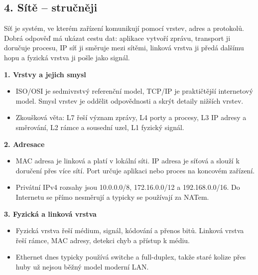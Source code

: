 
\subsection*{4. Sítě -- stručněji}
Síť je systém, ve kterém zařízení komunikují pomocí vrstev, adres a protokolů. Dobrá odpověď má ukázat cestu dat: aplikace vytvoří zprávu, transport ji doručuje procesu, IP síť ji směruje mezi sítěmi, linková vrstva ji předá dalšímu hopu a fyzická vrstva ji pošle jako signál.

\textbf{1. Vrstvy a jejich smysl}
\begin{itemize}
  \item ISO/OSI je sedmivrstvý referenční model, TCP/IP je praktičtější internetový model. Smysl vrstev je oddělit odpovědnosti a skrýt detaily nižších vrstev.
  \item Zkoušková věta: L7 řeší význam zprávy, L4 porty a procesy, L3 IP adresy a směrování, L2 rámce a sousední uzel, L1 fyzický signál.
\end{itemize}

\textbf{2. Adresace}
\begin{itemize}
  \item MAC adresa je linková a platí v lokální síti. IP adresa je síťová a slouží k doručení přes více sítí. Port určuje aplikaci nebo proces na koncovém zařízení.
  \item Privátní IPv4 rozsahy jsou 10.0.0.0/8, 172.16.0.0/12 a 192.168.0.0/16. Do Internetu se přímo nesměrují a typicky se používají za NATem.
\end{itemize}

\textbf{3. Fyzická a linková vrstva}
\begin{itemize}
  \item Fyzická vrstva řeší médium, signál, kódování a přenos bitů. Linková vrstva řeší rámce, MAC adresy, detekci chyb a přístup k médiu.
  \item Ethernet dnes typicky používá switche a full-duplex, takže staré kolize přes huby už nejsou běžný model moderní LAN.
\end{itemize}

